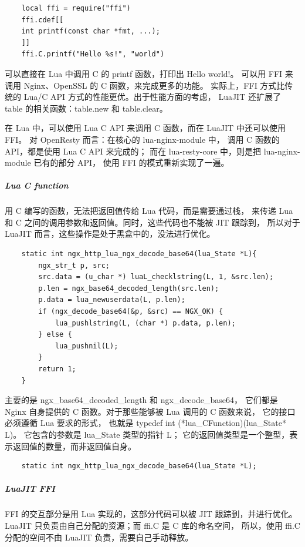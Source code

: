 \documentclass[a4,10pt]{ctexart}
\begin{document}
\begin{verbatim}
	local ffi = require("ffi")
	ffi.cdef[[
	int printf(const char *fmt, ...);
	]]
	ffi.C.printf("Hello %s!", "world")
\end{verbatim}

可以直接在 Lua 中调用 C 的 printf 函数，打印出 Hello world!。
可以用 FFI 来调用 Nginx、OpenSSL 的 C 函数，来完成更多的功能。
实际上，FFI 方式比传统的 Lua/C API 方式的性能更优。出于性能方面的考虑，
LuaJIT 还扩展了 table 的相关函数：table.new 和 table.clear。

在 Lua 中，可以使用 Lua C API 来调用 C 函数，而在 LuaJIT 中还可以使用 FFI。
对 OpenResty 而言：在核心的 lua-nginx-module 中，
调用 C 函数的 API，都是使用 Lua C API 来完成的；
而在 lua-resty-core 中，则是把 lua-nginx-module 已有的部分 API，
使用 FFI 的模式重新实现了一遍。

\subparagraph{Lua C function}

用 C 编写的函数，无法把返回值传给 Lua 代码，而是需要通过栈，
来传递 Lua 和 C 之间的调用参数和返回值。同时，这些代码也不能被 JIT 跟踪到，
所以对于 LuaJIT 而言，这些操作是处于黑盒中的，没法进行优化。
\begin{verbatim}
	static int ngx_http_lua_ngx_decode_base64(lua_State *L){
		ngx_str_t p, src;
		src.data = (u_char *) luaL_checklstring(L, 1, &src.len);
		p.len = ngx_base64_decoded_length(src.len);
		p.data = lua_newuserdata(L, p.len);
		if (ngx_decode_base64(&p, &src) == NGX_OK) {
			lua_pushlstring(L, (char *) p.data, p.len);
		} else {
			lua_pushnil(L);
		}
		return 1;
	}
\end{verbatim}

主要的是 ngx\_base64\_decoded\_length 和 ngx\_decode\_base64，
它们都是 Nginx 自身提供的 C 函数。对于那些能够被 Lua 调用的 C 函数来说，
它的接口必须遵循 Lua 要求的形式，
也就是 typedef int (*lua\_CFunction)(lua\_State* L)。
它包含的参数是 lua\_State 类型的指针 L；
它的返回值类型是一个整型，表示返回值的数量，而非返回值自身。

\begin{verbatim}
	static int ngx_http_lua_ngx_decode_base64(lua_State *L);
\end{verbatim}

\subparagraph{LuaJIT FFI}

FFI 的交互部分是用 Lua 实现的，这部分代码可以被 JIT 跟踪到，并进行优化。
LuaJIT 只负责由自己分配的资源；而 ffi.C 是 C 库的命名空间，
所以，使用 ffi.C 分配的空间不由 LuaJIT 负责，需要自己手动释放。
\end{document}
